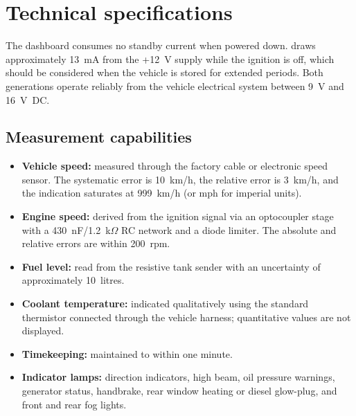 \chapter{Technical specifications}\label{ch:technical-specs}

The \ReplicaGenOne{} dashboard consumes no standby current when powered down. \ReplicaNextShort{} draws approximately 13~mA from the +12~V supply while the ignition is off, which should be considered when the vehicle is stored for extended periods. Both generations operate reliably from the vehicle electrical system between 9~V and 16~V~DC.

\section{Measurement capabilities}
\begin{itemize}
    \item \textbf{Vehicle speed:} measured through the factory cable or electronic speed sensor. The systematic error is 10~km/h, the relative error is 3~km/h, and the indication saturates at 999~km/h (or mph for imperial units).
    \item \textbf{Engine speed:} derived from the ignition signal via an optocoupler stage with a 430~nF/1.2~k\ensuremath{\Omega} RC network and a diode limiter. The absolute and relative errors are within 200~rpm.
    \item \textbf{Fuel level:} read from the resistive tank sender with an uncertainty of approximately 10~litres.
    \item \textbf{Coolant temperature:} indicated qualitatively using the standard thermistor connected through the vehicle harness; quantitative values are not displayed.
    \item \textbf{Timekeeping:} maintained to within one minute.
    \item \textbf{Indicator lamps:} direction indicators, high beam, oil pressure warnings, generator status, handbrake, rear window heating or diesel glow-plug, and front and rear fog lights.
\end{itemize}
